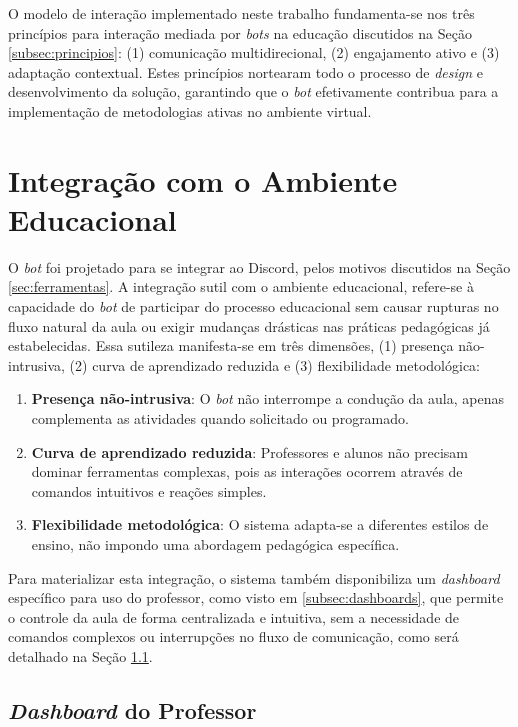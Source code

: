 O modelo de interação implementado neste trabalho fundamenta-se nos três
princípios para interação mediada por \textit{bots} na educação discutidos na
Seção \ref{subsec:principios}: (1) comunicação multidirecional, (2) engajamento
ativo e (3) adaptação contextual. Estes princípios nortearam todo o processo de
\textit{design} e desenvolvimento da solução, garantindo que o \textit{bot}
efetivamente contribua para a implementação de metodologias ativas no ambiente
virtual.

\section{Integração com o Ambiente Educacional}
\label{sec:integracao}

O \textit{bot} foi projetado para se integrar ao Discord, pelos motivos
discutidos na Seção \ref{sec:ferramentas}. A integração sutil com o ambiente
educacional, refere-se à capacidade do \textit{bot} de participar do processo
educacional sem causar rupturas no fluxo natural da aula ou exigir mudanças
drásticas nas práticas pedagógicas já estabelecidas. Essa sutileza manifesta-se
em três dimensões, (1) presença não-intrusiva, (2) curva de aprendizado reduzida
e (3) flexibilidade metodológica:

\begin{enumerate}
\item \textbf{Presença não-intrusiva}: O \textit{bot} não interrompe a condução
da aula, apenas complementa as atividades quando solicitado ou programado.
\item \textbf{Curva de aprendizado reduzida}: Professores e alunos não precisam
dominar ferramentas complexas, pois as interações ocorrem através de comandos
intuitivos e reações simples.
\item \textbf{Flexibilidade metodológica}: O sistema adapta-se a diferentes
estilos de ensino, não impondo uma abordagem pedagógica específica.
\end{enumerate}

Para materializar esta integração, o sistema também disponibiliza um
\textit{dashboard} específico para uso do professor, como visto em
\ref{subsec:dashboards}, que permite o controle da aula de forma centralizada e
intuitiva, sem a necessidade de comandos complexos ou interrupções no fluxo de
comunicação, como será detalhado na Seção \ref{subsec:dashboard}.

\subsection{\textit{Dashboard} do Professor}
\label{subsec:dashboard}

